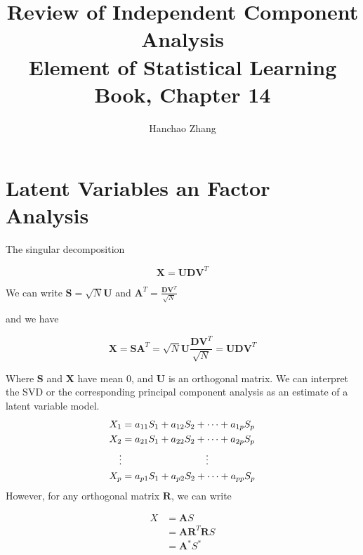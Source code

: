 \documentclass{article}
\begin{document}
\title{Review of Independent Component Analysis\\ \small{Element of Statistical Learning Book, Chapter 14}}

\author{Hanchao Zhang}

\maketitle

\section{Latent Variables an Factor Analysis}

The singular decomposition 

\begin{equation}
	\pmb X = \pmb U \pmb D \pmb V^T
\end{equation}

We can write $\pmb S = \sqrt N \pmb U$ and $\pmb A^T = \frac{\pmb D\pmb V^T}{\sqrt{N}}$

and we have 

\begin{equation}
	\pmb X = \pmb S \pmb A^T = \sqrt N \pmb U \frac{\pmb D\pmb V^T}{\sqrt{N}} = \pmb U \pmb D \pmb V^T
\end{equation}

Where $\pmb S$ and $\pmb X$ have mean $0$, and $\pmb U$ is an orthogonal matrix. We can interpret the SVD or the corresponding principal component analysis as an estimate of a latent variable model.
\begin{equation}
\begin{aligned}
	X_1 &= a_{11}S_1 + a_{12}S_2 + \cdots + a_{1p} S_p\\
	X_2 &= a_{21}S_1 + a_{22}S_2 + \cdots + a_{2p} S_p\\
	\vdots & \hspace{30mm} \vdots \\
	X_p &= a_{p1}S_1 + a_{p2}S_2 + \cdots + a_{pp} S_p
\end{aligned}
\end{equation}
However, for any orthogonal matrix $\pmb R$, we can write

\begin{equation}
\begin{aligned}
	X & = \pmb A S \\
	& = \pmb A \pmb R^T \pmb R S \\
	& = \pmb A^* S^*
\end{aligned}
\end{equation}
\end{document}

